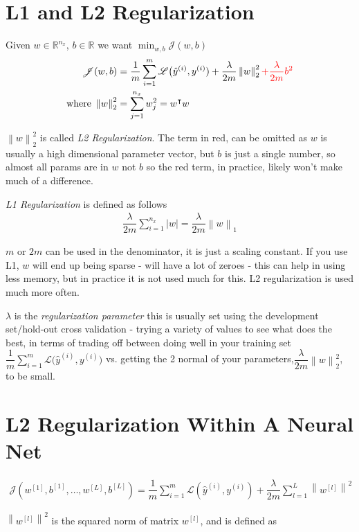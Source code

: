 \documentclass[12pt,reqno]{book}      %
\newcommand\norm[1]{\left\lVert#1\right\rVert}
\def\R{\mathbb{ R}}
\def\J{\mathscr{J}}
\def\L{\mathscr{L}}
\begin{document}
\section{L1 and L2 Regularization}
Given $w \in \R^{n_x}$, $b \in \R$ we want $\min_{w,b} \J(w,b)$
\begin{align}
\J(w,b) &= \dfrac{1}{m} \sum_{i=1}^{m} \L\big( \hat{y}^{(i)}, y^{(i)}) 
	+ \dfrac{\lambda}{2m} \norm{w}^2_2 \textcolor{red}{+ \dfrac{\lambda}{2m} b^2}\\
\text{where } \norm{w}^2_2 &= \sum_{j=1}^{n_x} w_j^2 = w^\intercal w
\end{align}

$\norm{w}^2_2$ is called \textit{L2 Regularization}. The term in red, can be omitted as $w$ is usually a high dimensional parameter vector, but $b$ is just a single number, so almost all params are in $w$ not $b$ so the red term, in practice, likely won't make much of a difference.

\textit{L1 Regularization} is defined as follows
\begin{align}
\dfrac{\lambda}{2m} \sum_{i=1}^{n_x} \lvert w \rvert = \dfrac{\lambda}{2m} \norm{w}_1
\end{align}

$m$ or $2m$ can be used in the denominator, it is just a scaling constant. If you use L1, $w$ will end up being sparse - will have a lot of zeroes - this can help in using less memory, but in practice it is not used much for this. L2 regularization is used much more often.

$\lambda$ is the \textit{regularization parameter} this is usually set using the development set/hold-out cross validation - trying a variety of values to see what does the best, in terms of trading off between doing well in your training set $\dfrac{1}{m} \sum_{i=1}^{m} \L\big( \hat{y}^{(i)}, y^{(i)})$ vs. getting the 2 normal of your parameters,$\dfrac{\lambda}{2m} \norm{w}^2_2$, to be small.

\section{L2 Regularization Within A Neural Net}

\begin{align}
\J(w^{[1]}, b^{[1]}, \ldots, w^{[L]}, b^{[L]}) = 
	\dfrac{1}{m} \sum_{i=1}^{m} \L(\hat{y}^{(i)}, y^{(i)}) 
	+ \dfrac{\lambda}{2m} \sum_{l=1}^{L} \norm{w^{[l]}}^2
\end{align}

$\norm{w^{[l]}}^2$ is the squared norm of matrix $w^{[l]}$, and is defined as
\end{document}
